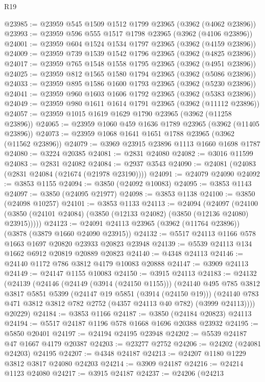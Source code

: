 \begin{lexlean}{R19}
\begin{coremodule}
@23985 := @23959 @545 @1509 @1512 @1799 @23965 (@3962 (@4062 @23896))
@23993 := @23959 @596 @555 @1517 @1798 @23965 (@3962 (@4106 @23896))
@24001 := @23959 @604 @1524 @1534 @1797 @23965 (@3962 (@4159 @23896))
@24009 := @23959 @739 @1539 @1542 @1796 @23965 (@3962 (@4825 @23896))
@24017 := @23959 @765 @1548 @1558 @1795 @23965 (@3962 (@4951 @23896))
@24025 := @23959 @812 @1565 @1580 @1794 @23965 (@3962 (@5086 @23896))
@24033 := @23959 @895 @1586 @1600 @1793 @23965 (@3962 (@5230 @23896))
@24041 := @23959 @960 @1603 @1606 @1792 @23965 (@3962 (@5383 @23896))
@24049 := @23959 @980 @1611 @1614 @1791 @23965 (@3962 (@11112 @23896))
@24057 := @23959 @1015 @1619 @1629 @1790 @23965 (@3962 (@11258 @23896))
@24065 := @23959 @1060 @459 @1636 @1789 @23965 (@3962 (@11405 @23896))
@24073 := @23959 @1068 @1641 @1651 @1788 @23965 (@3962 (@11562 @23896))
@24079 := @3969 @23915 @23896 @1113 @1660 @1698 @1787
@24080 := @3224 @20385
@24081 := @2831 @24080
@24082 := @3016 @11599
@24083 := @2831 @24082
@24084 := @2937 @3543
@24090 := @24081 (@24083 (@2831 @24084 (@21674 (@21978 @23190))))
@24091 := @24079 @24090
@24092 := @3853 @1155
@24094 := @3850 (@24092 @10083)
@24095 := @3853 @1143
@24097 := @3850 (@24095 @21977)
@24098 := @3853 @1138
@24100 := @3850 (@24098 @10257)
@24101 := @3853 @1133
@24113 := @24094
    (@24097 (@24100 (@3850 (@24101 @24084) (@3850 (@12133 @24082) (@3850 (@12136 @24080) @23915)))))
@24123 := @24091 @24113 @23965 (@3962 (@11764 @23896)) (@3878 (@3879 @1660 @24090 @23915))
@24132 := @5517 @24113 @1166 @578 @1663 @1697 @20820 @23933 @20823 @23948
@24139 := @5539 @24113 @134 @1662 @6912 @20819 @20889 @20823
@24140 := @4348 @24113
@24146 := @24140 @1172 @786 @3812 @4179 @10083 @20888
@24147 := @3909 @24113
@24149 := @24147 @1155 @10083
@24150 := @3915 @24113
@24183 := @24132
    (@24139
      (@24146
        (@24149 (@3914 (@24150 @1155)))
        (@24140
          @495
          @785
          @3812
          @3817
          @5851
          @5399
          (@24147 @19 @5851 (@3914 (@24150 @19)))
          (@24140 @783 @471 @3812 @3812 @782 @2752 (@4357 @24113 @40 @782) (@3999 @24113))))
      @20229)
@24184 := @3853 @1166
@24187 := @3850 (@24184 @20823) @24113
@24194 := @5517 @24187 @1196 @578 @1668 @1696 @20388 @23932
@24195 := @5850 @20401
@24197 := @24194 @24195 @23948
@24202 := @5539 @24187 @47 @1667 @4179 @20387
@24203 := @23277 @2752
@24206 := @24202 (@24081 @24203) @24195
@24207 := @4348 @24187
@24213 := @24207 @1180 @1229 @3812 @3817 @24080 @24203
@24214 := @3909 @24187
@24216 := @24214 @1123 @24080
@24217 := @3915 @24187
@24237 := @24206
    (@24213

\end{coremodule}
\end{lexlean}
